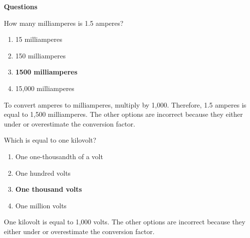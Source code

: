 

\textbf{Questions}

\begin{tcolorbox}[colback=gray!10!white,colframe=black!75!black,title={T5B01}]
    How many milliamperes is 1.5 amperes?
    \begin{enumerate}[label=\Alph*),noitemsep]
        \item 15 milliamperes
        \item 150 milliamperes
        \item \textbf{1500 milliamperes}
        \item 15,000 milliamperes
    \end{enumerate}
\end{tcolorbox}
To convert amperes to milliamperes, multiply by 1,000. Therefore, 1.5 amperes is equal to 1,500 milliamperes. The other options are incorrect because they either under or overestimate the conversion factor.


\begin{tcolorbox}[colback=gray!10!white,colframe=black!75!black,title={T5B03}]
    Which is equal to one kilovolt?
    \begin{enumerate}[label=\Alph*),noitemsep]
        \item One one-thousandth of a volt
        \item One hundred volts
        \item \textbf{One thousand volts}
        \item One million volts
    \end{enumerate}
\end{tcolorbox}
One kilovolt is equal to 1,000 volts. The other options are incorrect because they either under or overestimate the conversion factor.

